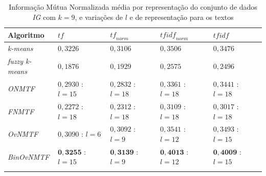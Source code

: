 \documentclass[
    12pt,                %
    oneside,            %
    a4paper,            %
    english,            %
    brazil                %
    ]{abntex2ppgsi}
\begin{document}
\begin{table}[H]
\centering
    \caption{Informação Mútua Normalizada média por representação do conjunto de dados \textit{IG} com $k = 9$, e variações de $l$ e de representação para os textos}
    \begin{tabular}{lllll}
        \hline
        \textbf{Algoritmo}              & $\textit{tf}$ & $\textit{tf}_{norm}$ & $\textit{tfidf}_{norm}$ & $\textit{tfidf}$ \\
        \hline
        \textit{k-means}       & $0,3226$            & $0,3106$            & $0,3506$            & $0,3476$ \\
        \textit{fuzzy k-means} & $0,1876$            & $0,1929$            & $0,2575$            & $0,2496$ \\
        \textit{ONMTF}         & $0,2930$ : $l = 15$ & $0,2832$ : $l = 18$ & $0,3361$ : $l = 18$ & $0,3441$ : $l = 18$ \\
        \textit{FNMTF}         & $0,2272$ : $l = 18$ & $0,2312$ : $l = 18$ & $0,3109$ : $l = 18$ & $0,3017$ : $l = 18$ \\
        \textit{OvNMTF}        & $0,3090$ : $l = 6$  & $0,3092$ : $l = 9$  & $0,3541$ : $l = 12$ & $0,3493$ : $l = 15$ \\
        \textit{BinOvNMTF}     & $\mathbf{0,3255}$ : $l = 15$ & $\mathbf{0,3139}$ : $l = 9$  & $\mathbf{0,4013}$ : $l = 12$ & $\mathbf{0,4009}$ : $l = 15$ \\
        \hline \\
    \end{tabular}
    \label{tab:experiments-quant-nmi:nips}
\end{table}
\end{document}
